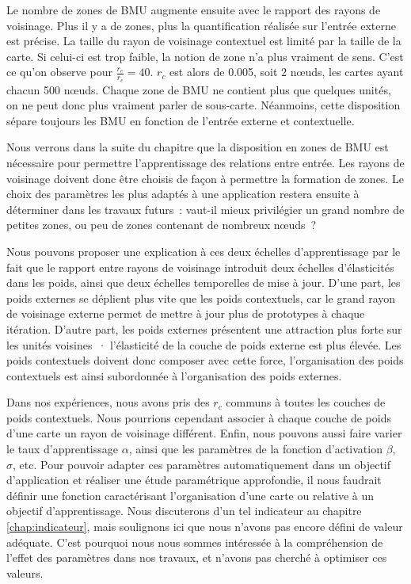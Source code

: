 \documentclass[../main]{subfiles}
\begin{document}
Le nombre de zones de BMU augmente ensuite avec le rapport des rayons de voisinage. Plus il y a de zones, plus la quantification réalisée sur l'entrée externe est précise.
La taille du rayon de voisinage contextuel est  limité par la taille de la carte. Si celui-ci est trop faible, la notion de zone n'a plus vraiment de sens. C'est ce qu'on observe pour $\frac{r_e}{r_c} = 40$. $r_c$ est alors de 0.005, soit $2$ n\oe{}uds, les cartes ayant chacun 500 n\oe{}uds. 
Chaque zone de BMU ne contient plus que quelques unités, on ne peut donc plus vraiment parler de sous-carte. Néanmoins, cette disposition sépare toujours les BMU en fonction de l'entrée externe et contextuelle.

Nous verrons dans la suite du chapitre que la disposition en zones de BMU est nécessaire pour permettre l'apprentissage des relations entre entrée. Les rayons de voisinage doivent donc être choisis de façon à permettre la formation de zones. Le choix des paramètres les plus adaptés à une application restera ensuite à déterminer dans les travaux futurs~: vaut-il mieux privilégier un grand nombre de petites zones, ou peu de zones contenant de nombreux n\oe{}uds~?

Nous pouvons proposer une explication à ces deux échelles d'apprentissage par le fait que le rapport entre rayons de voisinage introduit deux échelles d'élasticités dans les poids, ainsi que deux échelles temporelles de mise à jour.
D'une part, les poids externes se déplient plus vite que les poids contextuels, car le grand rayon de voisinage externe permet de mettre à jour plus de prototypes à chaque itération.
D'autre part, les poids externes présentent une \og attraction \fg{} plus forte sur les unités voisines~· l'élasticité de la couche de poids externe est plus élevée.
Les poids contextuels doivent donc composer avec cette force, l'organisation des poids contextuels est ainsi subordonnée à l'organisation des poids externes. 


Dans nos expériences, nous avons pris des $r_c$ communs à toutes les couches de poids contextuels.
Nous pourrions cependant associer à chaque couche de poids d'une carte un rayon de voisinage différent. 
Enfin, nous pouvons aussi faire varier le taux d'apprentissage $\alpha$, ainsi que les paramètres de la fonction d'activation $\beta$, $\sigma$, etc.
Pour pouvoir adapter ces paramètres automatiquement dans un objectif d'application et réaliser une étude paramétrique approfondie, il nous faudrait définir une fonction caractérisant l'organisation d'une carte ou relative à un objectif d'apprentissage. 
Nous discuterons d'un tel indicateur au chapitre \ref{chap:indicateur}, mais soulignons ici que nous n'avons pas encore défini de valeur adéquate. C'est pourquoi nous nous sommes intéressée à la compréhension de l'effet des paramètres dans nos travaux, et n'avons pas cherché à optimiser ces valeurs.
\end{document}
